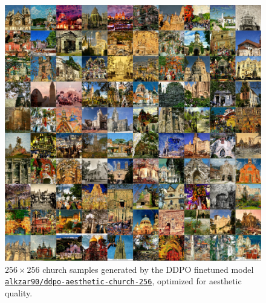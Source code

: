 \begin{appendixs}
        \begin{figure}
            \centering
            \includegraphics[scale=0.8]{img/results/ddpo-church-aesthetic-samples.png}
            \vspace{-4pt}  %
            \captionsetup{width=\textwidth} %
            \caption{$256\times256$ church samples generated by the DDPO finetuned model \href{https://huggingface.co/alkzar90/ddpo-aesthetic-church-256}{\texttt{\texttt{alkzar90/ddpo-aesthetic-church-256}}}, optimized for aesthetic quality.}
            \label{fig:ddpo-church-aesthetic-samples}
        \end{figure}

\end{appendixs}